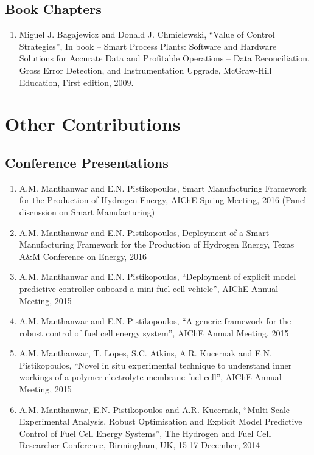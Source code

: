 \documentclass[10pt]{article}
\begin{document}
\subsection{Book Chapters}
\begin{enumerate}[nosep]
\item Miguel J. Bagajewicz and Donald J. Chmielewski, ``Value of Control Strategies'', In book -- Smart Process Plants: Software and Hardware Solutions for Accurate Data and Profitable Operations -- Data Reconciliation, Gross Error Detection, and Instrumentation Upgrade, McGraw-Hill Education, First edition, 2009.
\end{enumerate}

\section{Other Contributions}
\subsection{Conference Presentations}
\begin{enumerate}[nosep]
\item A.M. Manthanwar and  E.N. Pistikopoulos, Smart Manufacturing Framework for the Production of Hydrogen Energy, AIChE Spring Meeting, 2016 (Panel discussion on Smart Manufacturing)

\item A.M. Manthanwar and  E.N. Pistikopoulos, Deployment of a Smart Manufacturing Framework for the Production of Hydrogen Energy, Texas A\&M Conference on Energy, 2016

\item A.M. Manthanwar and E.N. Pistikopoulos, ``Deployment of explicit model predictive controller onboard a mini fuel cell vehicle'', AIChE Annual Meeting, 2015

\item A.M. Manthanwar and E.N. Pistikopoulos, ``A generic framework for the robust control of fuel cell energy system'', AIChE Annual Meeting, 2015

\item A.M. Manthanwar, T. Lopes, S.C. Atkins, A.R. Kucernak and E.N. Pistikopoulos, ``Novel in situ experimental technique to understand inner workings of a polymer electrolyte membrane fuel cell'', AIChE Annual Meeting, 2015

\item A.M. Manthanwar, E.N. Pistikopoulos and A.R. Kucernak, ``Multi-Scale Experimental Analysis, Robust Optimisation and Explicit Model Predictive Control of Fuel Cell Energy Systems'', The Hydrogen and Fuel Cell Researcher Conference, Birmingham, UK, 15-17 December, 2014
\end{enumerate}
\end{document}

